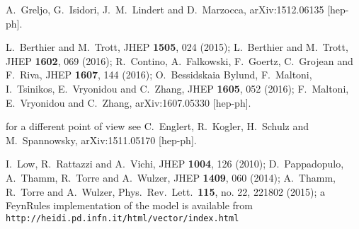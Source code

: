   A.~Greljo, G.~Isidori, J.~M.~Lindert and D.~Marzocca,
  arXiv:1512.06135 [hep-ph].

  L.~Berthier and M.~Trott,
  JHEP {\bf 1505}, 024 (2015);
  L.~Berthier and M.~Trott,
  JHEP {\bf 1602}, 069 (2016);
  R.~Contino, A.~Falkowski, F.~Goertz, C.~Grojean and F.~Riva,
  JHEP {\bf 1607}, 144 (2016);
  O.~Bessidskaia Bylund, F.~Maltoni, I.~Tsinikos, E.~Vryonidou and C.~Zhang,
  JHEP {\bf 1605}, 052 (2016);
  F.~Maltoni, E.~Vryonidou and C.~Zhang,
  arXiv:1607.05330 [hep-ph].

  for a different point of view see \eg 
  C.~Englert, R.~Kogler, H.~Schulz and M.~Spannowsky,
  arXiv:1511.05170 [hep-ph].

  I.~Low, R.~Rattazzi and A.~Vichi,
  JHEP {\bf 1004}, 126 (2010);
  D.~Pappadopulo, A.~Thamm, R.~Torre and A.~Wulzer,
  JHEP {\bf 1409}, 060 (2014); 
  A.~Thamm, R.~Torre and A.~Wulzer,
  Phys.\ Rev.\ Lett.\  {\bf 115}, no. 22, 221802 (2015);
  a FeynRules implementation
  of the model is available from 
  \texttt{http://heidi.pd.infn.it/html/vector/index.html}

